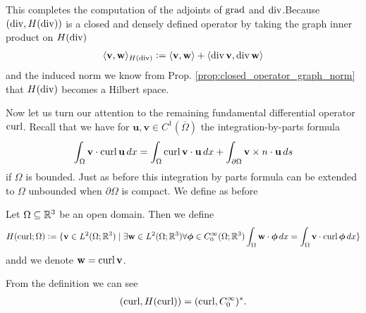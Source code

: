\documentclass[../master_thesis.tex]{subfiles}
\begin{document}


This completes the computation of the adjoints of $\operatorname{grad}$ and $\operatorname{div}$.Because  
$(\operatorname{div}, H(\operatorname{div}))$ is a closed and densely defined operator 
by taking the graph inner product on $H(\operatorname{div})$
\begin{align*}
    \langle \mathbf{v}, \mathbf{w} \rangle _{H(\operatorname{div})}
    \vcentcolon= \langle \mathbf{v}, \mathbf{w} \rangle + \langle \operatorname{div} \mathbf{v}, \operatorname{div} \mathbf{w} \rangle
\end{align*}
and the induced norm
we know from Prop. \ref{prop:closed_operator_graph_norm} that $H(\operatorname{div})$ becomes a Hilbert space.

Now let us turn our attention to the remaining fundamental differential operator 
$\operatorname{curl}$. Recall that we have for 
$\mathbf{u}, \mathbf{v} \in C^1(\overline{\Omega})$ the integration-by-parts 
formula
\begin{align}
    \int_\Omega \mathbf{v} \cdot \operatorname{curl} \mathbf{u} \, dx 
    = \int_\Omega \operatorname{curl} \mathbf{v} \cdot \mathbf{u} \, dx 
        + \int_{\partial \Omega} \mathbf{v} \times n \cdot \mathbf{u} \, ds 
        \label{eq:integration_by_parts_curl_C1} 
\end{align}
if $\Omega$ is bounded. Just as before this integration by parts formula can 
be extended to $\Omega$ unbounded when $\partial \Omega$ is compact. 
We define as before 
\begin{definition}
    Let $\Omega \subseteq \mathbb{R}^3$ be an open domain. 
    Then we define 
    \begin{align*}
        H(\operatorname{curl};\Omega) \vcentcolon= \{ \mathbf{v} \in L^2(\Omega;\mathbb{R}^3)
        \mid \exists \mathbf{w} \in L^2(\Omega; \mathbb{R}^3) 
        \forall \boldsymbol{\phi} \in C_0^\infty(\Omega;\mathbb{R}^3)
        \int_\Omega \mathbf{w} \cdot \boldsymbol{\phi} \, dx 
        = \int_\Omega \mathbf{v} \cdot \operatorname{curl} \boldsymbol{\phi} \, dx \}
    \end{align*}
    andd we denote $\mathbf{w} = \operatorname{curl} \mathbf{v}$.
\end{definition}
From the definition we can see
\begin{align*}
    (\operatorname{curl}, H(\operatorname{curl})) = (\operatorname{curl}, C_0^\infty)^*.
\end{align*}
\end{document}
